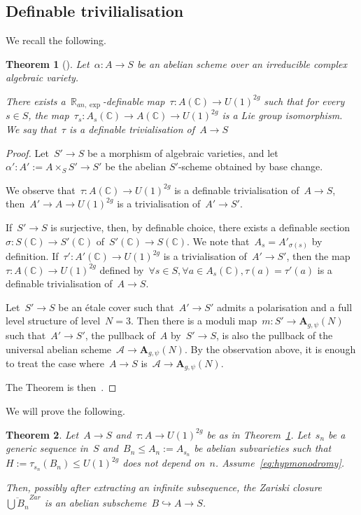 \documentclass[12pt]{amsart}
\newtheorem{theorem}{Theorem}[section]
\newcommand{\R}{{\mathbb R}}
\newcommand{\C}{{\mathbb C}}
\newcommand{\ol}{\overline}
\begin{document}
\subsection{Definable trivilialisation}
We recall the following.
\begin{theorem}[{\cite[Theorem~1.2]{PS}}]\label{thm:PS} Let~$\alpha:A\to S$ be an abelian scheme over an irreducible complex algebraic variety.

There exists a~$\R_{an,\exp}$-definable map~$\tau:A(\C)\to U(1)^{2g}$ such that for every~$s\in S$, the map~$\tau_s:A_s(\C)\to A(\C)\to U(1)^{2g}$ is a Lie group isomorphism. We say that~$\tau$ is a definable trivialisation of~$A\to S$
\end{theorem}
\begin{proof}Let~$S'\to S$ be a morphism of algebraic varieties, and let~$\alpha':A':=A\times_S S'\to S'$ be the abelian $S'$-scheme obtained by base change. 

We observe that~$\tau:A(\C)\to U(1)^{2g}$ is a definable trivialisation of~$A\to S$, then~$A'\to A\to U(1)^{2g}$ is a trivialisation of~$A'\to S'$. 

If~$S'\to S$ is surjective, then, by definable choice, there exists a definable section~$\sigma:S(\C)\to S'(\C)$ of~$S'(\C)\to S(\C)$. We note that~$A_s=A'_{\sigma(s)}$ by definition. If~$\tau':A'(\C)\to U(1)^{2g}$ is a trivialisation of~$A'\to S'$, then the map~$\tau:A(\C)\to U(1)^{2g}$ defined by~$\forall s\in S, \forall a\in A_s(\C), \tau(a)=\tau'(a)$ is a definable trivialisation of~$A\to S$.

Let~$S'\to S$ be an étale cover such that~$A'\to S'$ admits a polarisation and a full level structure of level~$N=3$.
Then there is a moduli map~$m:S'\to \mathbf{A}_{g,\psi}(N)$ such that~$A'\to S'$, the pullback of~$A$ by~$S'\to S$, is also the pullback of the universal abelian scheme~$\mathcal{A}\to \mathbf{A}_{g,\psi}(N)$. By the observation above, it is enough to treat the case where~$A\to S$ is~$\mathcal{A}\to \mathbf{A}_{g,\psi}(N)$.

The Theorem is then~\cite[Theorem~1.2]{PS}.
\end{proof}

We will prove the following.
\begin{theorem}\label{thm:locus}
Let~$A\to S$ and~$\tau:A\to U(1)^{2g}$ be as in Theorem~\ref{thm:PS}.
Let~$s_n$ be a generic sequence in~$S$ and~$B_n\leq A_n:=A_{s_n}$ be abelian subvarieties such that~$H:=\tau_{s_n}(B_n)\leq  U(1)^{2g}$ does not depend on~$n$. Assume~\eqref{eq:hypmonodromy}.

Then, possibly after extracting an infinite subsequence, the Zariski closure~$\ol{\bigcup B_n}^{Zar}$ is an abelian subscheme~$B\hookrightarrow A\to S$.
\end{theorem}
\end{document}
